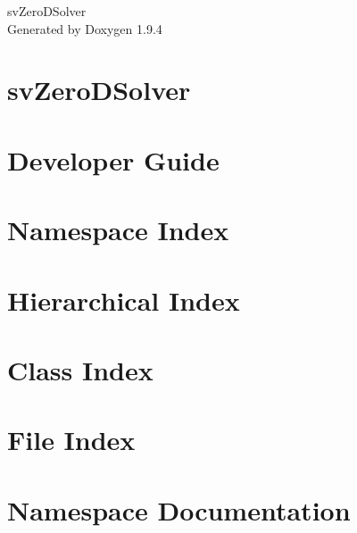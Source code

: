 \documentclass[twoside]{book}
\newcommand{\+}{\discretionary{\mbox{\scriptsize$\hookleftarrow$}}{}{}}
\newcommand{\clearemptydoublepage}{%
    \newpage{\pagestyle{empty}\cleardoublepage}%
  }
\begin{document}
  \raggedbottom
    \hypersetup{pageanchor=false,
                bookmarksnumbered=true,
                pdfencoding=unicode
               }
  \begin{titlepage}
  \vspace*{7cm}
  \begin{center}%
  {\Large sv\+Zero\+DSolver}\\
  \vspace*{1cm}
  {\large Generated by Doxygen 1.9.4}\\
  \end{center}
  \end{titlepage}
  \clearemptydoublepage
  \tableofcontents
  \clearemptydoublepage
  \hypersetup{pageanchor=true}
\chapter{sv\+Zero\+DSolver}
\label{index}\hypertarget{index}{}
\chapter{Developer Guide}
\label{md_developer_guide}

\chapter{Namespace Index}

\chapter{Hierarchical Index}

\chapter{Class Index}

\chapter{File Index}

\chapter{Namespace Documentation}




\end{document}
